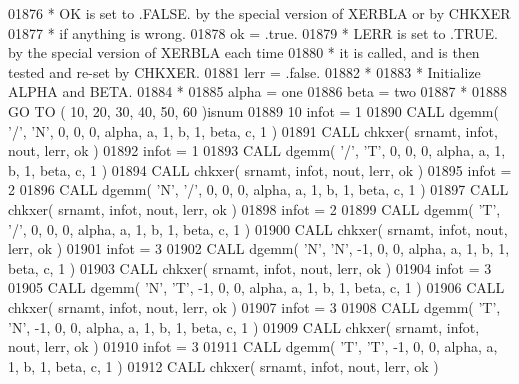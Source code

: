 \begin{DoxyCode}
01876 \textcolor{comment}{*     OK is set to .FALSE. by the special version of XERBLA or by CHKXER}
01877 \textcolor{comment}{*     if anything is wrong.}
01878       ok = .true.
01879 \textcolor{comment}{*     LERR is set to .TRUE. by the special version of XERBLA each time}
01880 \textcolor{comment}{*     it is called, and is then tested and re-set by CHKXER.}
01881       lerr = .false.
01882 \textcolor{comment}{*}
01883 \textcolor{comment}{*     Initialize ALPHA and BETA.}
01884 \textcolor{comment}{*}
01885       alpha = one
01886       beta = two
01887 \textcolor{comment}{*}
01888       \textcolor{keywordflow}{GO TO} ( 10, 20, 30, 40, 50, 60 )isnum
01889    10 infot = 1
01890       \textcolor{keyword}{CALL }dgemm( \textcolor{stringliteral}{'/'}, \textcolor{stringliteral}{'N'}, 0, 0, 0, alpha, a, 1, b, 1, beta, c, 1 )
01891       \textcolor{keyword}{CALL }chkxer( srnamt, infot, nout, lerr, ok )
01892       infot = 1
01893       \textcolor{keyword}{CALL }dgemm( \textcolor{stringliteral}{'/'}, \textcolor{stringliteral}{'T'}, 0, 0, 0, alpha, a, 1, b, 1, beta, c, 1 )
01894       \textcolor{keyword}{CALL }chkxer( srnamt, infot, nout, lerr, ok )
01895       infot = 2
01896       \textcolor{keyword}{CALL }dgemm( \textcolor{stringliteral}{'N'}, \textcolor{stringliteral}{'/'}, 0, 0, 0, alpha, a, 1, b, 1, beta, c, 1 )
01897       \textcolor{keyword}{CALL }chkxer( srnamt, infot, nout, lerr, ok )
01898       infot = 2
01899       \textcolor{keyword}{CALL }dgemm( \textcolor{stringliteral}{'T'}, \textcolor{stringliteral}{'/'}, 0, 0, 0, alpha, a, 1, b, 1, beta, c, 1 )
01900       \textcolor{keyword}{CALL }chkxer( srnamt, infot, nout, lerr, ok )
01901       infot = 3
01902       \textcolor{keyword}{CALL }dgemm( \textcolor{stringliteral}{'N'}, \textcolor{stringliteral}{'N'}, -1, 0, 0, alpha, a, 1, b, 1, beta, c, 1 )
01903       \textcolor{keyword}{CALL }chkxer( srnamt, infot, nout, lerr, ok )
01904       infot = 3
01905       \textcolor{keyword}{CALL }dgemm( \textcolor{stringliteral}{'N'}, \textcolor{stringliteral}{'T'}, -1, 0, 0, alpha, a, 1, b, 1, beta, c, 1 )
01906       \textcolor{keyword}{CALL }chkxer( srnamt, infot, nout, lerr, ok )
01907       infot = 3
01908       \textcolor{keyword}{CALL }dgemm( \textcolor{stringliteral}{'T'}, \textcolor{stringliteral}{'N'}, -1, 0, 0, alpha, a, 1, b, 1, beta, c, 1 )
01909       \textcolor{keyword}{CALL }chkxer( srnamt, infot, nout, lerr, ok )
01910       infot = 3
01911       \textcolor{keyword}{CALL }dgemm( \textcolor{stringliteral}{'T'}, \textcolor{stringliteral}{'T'}, -1, 0, 0, alpha, a, 1, b, 1, beta, c, 1 )
01912       \textcolor{keyword}{CALL }chkxer( srnamt, infot, nout, lerr, ok )

\end{DoxyCode}
